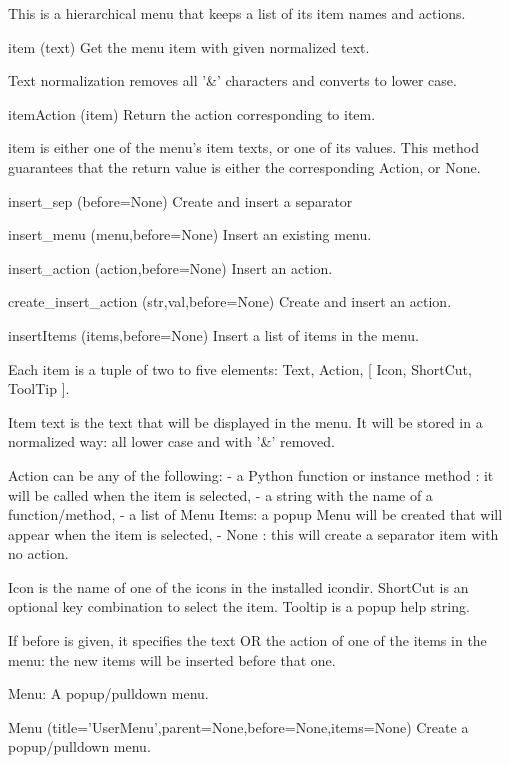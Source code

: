         This is a hierarchical menu that keeps a list of its item
        names and actions.
        

item (text)
Get the menu item with given normalized text.

        Text normalization removes all '\&' characters and
        converts to lower case.
        

itemAction (item)
Return the action corresponding to item.

        item is either one of the menu's item texts, or one of its
        values. This method guarantees that the return value is either the
        corresponding Action, or None.
        

insert_sep (before=None)
Create and insert a separator

insert_menu (menu,before=None)
Insert an existing menu.

insert_action (action,before=None)
Insert an action.

create_insert_action (str,val,before=None)
Create and insert an action.

insertItems (items,before=None)
Insert a list of items in the menu.
        
        Each item is a tuple of two to five elements:
           Text, Action, [ Icon,  ShortCut, ToolTip ].

        Item text is the text that will be displayed in the menu.
        It will be stored in a normalized way: all lower case and with
        '\&' removed.

        Action can be any of the following:
          - a Python function or instance method : it will be called when the
            item is selected,
          - a string with the name of a function/method,
          - a list of Menu Items: a popup Menu will be created that will appear
            when the item is selected,
          - None : this will create a separator item with no action.

        Icon is the name of one of the icons in the installed icondir.
        ShortCut is an optional key combination to select the item.
        Tooltip is a popup help string.

        If before is given, it specifies the text OR the action of one of the
        items in the menu: the new items will be inserted before that one.
        

Menu: A popup/pulldown menu.

Menu (title='UserMenu',parent=None,before=None,items=None)
Create a popup/pulldown menu.

